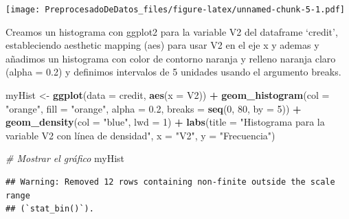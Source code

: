 \documentclass[
]{article}
\newenvironment{Shaded}{\begin{snugshade}}{\end{snugshade}}
\newcommand{\AttributeTok}[1]{\textcolor[rgb]{0.13,0.29,0.53}{#1}}
\newcommand{\CommentTok}[1]{\textcolor[rgb]{0.56,0.35,0.01}{\textit{#1}}}
\newcommand{\ConstantTok}[1]{\textcolor[rgb]{0.56,0.35,0.01}{#1}}
\newcommand{\DecValTok}[1]{\textcolor[rgb]{0.00,0.00,0.81}{#1}}
\newcommand{\FloatTok}[1]{\textcolor[rgb]{0.00,0.00,0.81}{#1}}
\newcommand{\FunctionTok}[1]{\textcolor[rgb]{0.13,0.29,0.53}{\textbf{#1}}}
\newcommand{\NormalTok}[1]{#1}
\newcommand{\OtherTok}[1]{\textcolor[rgb]{0.56,0.35,0.01}{#1}}
\newcommand{\SpecialCharTok}[1]{\textcolor[rgb]{0.81,0.36,0.00}{\textbf{#1}}}
\newcommand{\StringTok}[1]{\textcolor[rgb]{0.31,0.60,0.02}{#1}}
\begin{document}
\begin{Shaded}
\end{Shaded}

\texttt{[image: PreprocesadoDeDatos\_files/figure-latex/unnamed-chunk-5-1.pdf]}

Creamos un histograma con ggplot2 para la variable V2 del dataframe
`credit', estableciendo aesthetic mapping (aes) para usar V2 en el eje x
y ademas y añadimos un histograma con color de contorno naranja y
relleno naranja claro (alpha = 0.2) y definimos intervalos de 5 unidades
usando el argumento breaks.

\begin{Shaded}
\begin{Highlighting}[]
\NormalTok{myHist }\OtherTok{\textless{}{-}} \FunctionTok{ggplot}\NormalTok{(}\AttributeTok{data =}\NormalTok{ credit, }\FunctionTok{aes}\NormalTok{(}\AttributeTok{x =}\NormalTok{ V2)) }\SpecialCharTok{+}
  \FunctionTok{geom\_histogram}\NormalTok{(}\AttributeTok{col =} \StringTok{"orange"}\NormalTok{, }\AttributeTok{fill =} \StringTok{"orange"}\NormalTok{, }\AttributeTok{alpha =} \FloatTok{0.2}\NormalTok{, }\AttributeTok{breaks =} \FunctionTok{seq}\NormalTok{(}\DecValTok{0}\NormalTok{, }\DecValTok{80}\NormalTok{, }\AttributeTok{by =} \DecValTok{5}\NormalTok{)) }\SpecialCharTok{+}
  \FunctionTok{geom\_density}\NormalTok{(}\AttributeTok{col =} \StringTok{"blue"}\NormalTok{, }\AttributeTok{lwd =} \DecValTok{1}\NormalTok{) }\SpecialCharTok{+}
  \FunctionTok{labs}\NormalTok{(}\AttributeTok{title =} \StringTok{"Histograma para la variable V2 con línea de densidad"}\NormalTok{, }\AttributeTok{x =} \StringTok{"V2"}\NormalTok{, }\AttributeTok{y =} \StringTok{"Frecuencia"}\NormalTok{)}

\CommentTok{\# Mostrar el gráfico}
\NormalTok{myHist}
\end{Highlighting}
\end{Shaded}

\begin{verbatim}
## Warning: Removed 12 rows containing non-finite outside the scale range
## (`stat_bin()`).
\end{verbatim}
\end{document}
